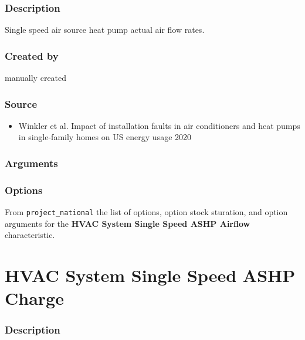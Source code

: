 \subsubsection{Description}\label{description-83}

Single speed air source heat pump actual air flow rates.

\subsubsection{Created by}\label{created-by-83}

manually created

\subsubsection{Source}\label{source-82}

\begin{itemize}
 
\item
  Winkler et al. \textquotesingle Impact of installation faults in air
  conditioners and heat pumps in single-family homes on US energy
  usage\textquotesingle{} 2020
\end{itemize}

\subsubsection{Arguments}\label{arguments-52}



\subsubsection{Options}\label{options-83}

From \texttt{project\_national} the list of options, option stock
sturation, and option arguments for the \textbf{HVAC System Single Speed
ASHP Airflow} characteristic.



\section{HVAC System Single Speed ASHP
Charge}\label{hvac_system_single_speed_ashp_charge}

\subsubsection{Description}\label{description-84}

